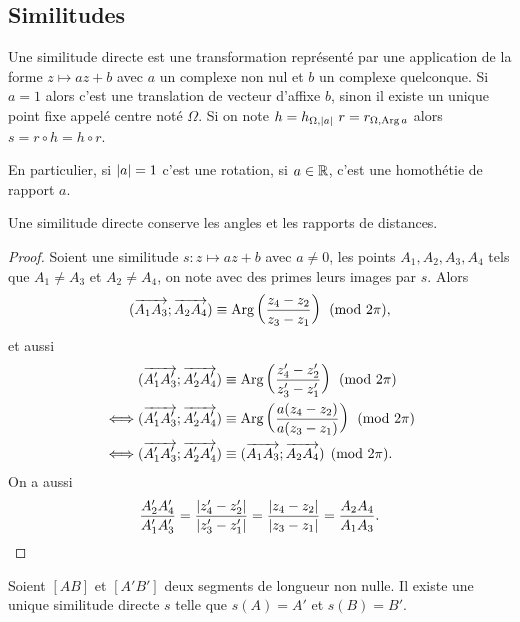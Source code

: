 \subsection{Similitudes}

Une similitude directe est une transformation représenté par une application de la forme $z \longmapsto az+b$ avec $a$ un complexe non nul et $b$ un complexe quelconque. Si $a=1$ alors c'est une translation de vecteur d'affixe $b$, sinon il existe un unique point fixe appelé centre noté $\Omega$. Si on note $h=h_{\Omega, \abs{a}} \ r=r_{\Omega, \Arg{a}}$ alors $s=r \circ h=h \circ r$.

En particulier, si $\left\lvert a\right\rvert=1$ c'est une rotation, si $a \in \mathbb{R}$, c'est une homothétie de rapport $a$.

\begin{prop}
  Une similitude directe conserve les angles et les rapports de distances.
\end{prop}
\begin{proof}
  Soient une similitude $s : z \longmapsto az+b$ avec $a \neq 0$, les points $A_1,A_2,A_3,A_4$ tels que $A_1 \neq A_3$ et $A_2 \neq A_4$, on note avec des primes leurs images par $s$. Alors
  \begin{equation}
    (\overrightarrow{A_1 A_3};\overrightarrow{A_2 A_4}) \equiv \operatorname{Arg}\left(\frac{z_4-z_2}{z_3-z_1}\right) \pmod {2\pi},
  \end{equation}
et aussi
\begin{align}
    &(\overrightarrow{A'_1 A'_3};\overrightarrow{A'_2 A'_4}) \equiv \operatorname{Arg}\left(\frac{z'_4-z'_2}{z'_3-z'_1}\right) \pmod {2\pi}\\
    \iff&(\overrightarrow{A'_1 A'_3};\overrightarrow{A'_2 A'_4}) \equiv \operatorname{Arg}\left(\frac{a(z_4-z_2)}{a(z_3-z_1)}\right) \pmod {2\pi}\\
    \iff&(\overrightarrow{A'_1 A'_3};\overrightarrow{A'_2 A'_4}) \equiv (\overrightarrow{A_1 A_3};\overrightarrow{A_2 A_4}) \pmod {2\pi}.
  \end{align}
  On a aussi
\begin{equation}
  \frac{A'_2A'_4}{A'_1A'_3}=\frac{\left\lvert z'_4-z'_2\right\rvert}{\left\lvert z'_3-z'_1\right\rvert}=\frac{\left\lvert z_4-z_2\right\rvert}{\left\lvert z_3-z_1\right\rvert}=\frac{A_2A_4}{A_1A_3}.
\end{equation}
\end{proof}

\begin{prop}
  Soient $[AB]$ et $[A'B']$ deux segments de longueur non nulle. Il existe une unique similitude directe $s$ telle que $s(A)=A'$ et $s(B)=B'$.
\end{prop}
